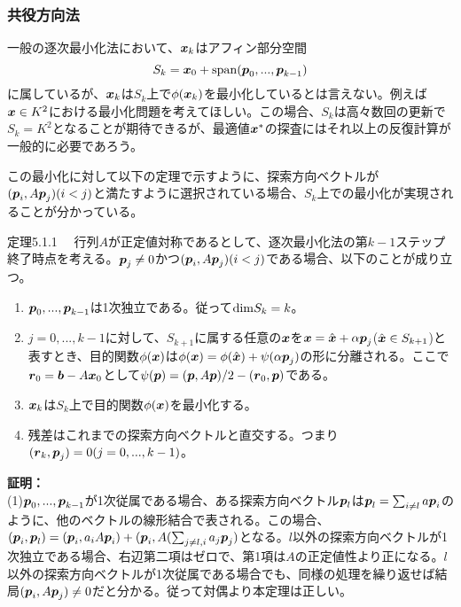 \documentclass[dvipdfmx, 9pt, a4paper]{jsarticle}
\numberwithin{equation}{subsection}
\newcommand{\bm}[1]{{\mbox{\boldmath $#1$}}}
\begin{document}
\subsubsection{共役方向法}
一般の逐次最小化法において、$\bm x_k$はアフィン部分空間
\begin{equation}
S_k=\bm x_0+{\rm span}(\bm p_0, ..., \bm p_{k-1}) \notag
\end{equation}
に属しているが、$\bm x_k$は$S_k$上で$\phi(\bm x_k)$を最小化しているとは言えない。例えば$\bm x \in K^2$における最小化問題を考えてほしい。この場合、$S_k$は高々数回の更新で$S_k=K^2$となることが期待できるが、最適値$\bm x^*$の探査にはそれ以上の反復計算が一般的に必要であろう。\par
この最小化に対して以下の定理で示すように、探索方向ベクトルが$(\bm p_i, A\bm p_j)(i < j)$と満たすように選択されている場合、$S_k$上での最小化が実現されることが分かっている。
\begin{itembox}[l]{定理5.1.1}
　行列$A$が正定値対称であるとして、逐次最小化法の第$k-1$ステップ終了時点を考える。$\bm p_j \neq 0$かつ$(\bm p_i, A\bm p_j)(i < j)$である場合、以下のことが成り立つ。
\begin{enumerate}
\item $\bm p_0, ..., \bm p_{k-1}$は1次独立である。従って${\rm dim}S_k=k$。
\item $j=0, ..., k-1$に対して、$S_{k+1}$に属する任意の$\bm x$を$\bm x=\hat{\bm x}+\alpha \bm p_j$($\hat{\bm x} \in S_{k+1}$)と表すとき、目的関数$\phi(\bm x)$は$\phi(\bm x)=\phi(\hat{\bm x})+\psi(\alpha \bm p_j)$の形に分離される。ここで$\bm r_0=\bm b-A\bm x_0$として$\psi(\bm p)=(\bm p, A\bm p)/2-(\bm r_0, \bm p)$である。
\item $\bm x_k$は$S_k$上で目的関数$\phi(\bm x)$を最小化する。
\item 残差はこれまでの探索方向ベクトルと直交する。つまり$(\bm r_k, \bm p_j)=0(j=0, ..., k-1)$。
\end{enumerate}
\end{itembox}
{\bf 証明：}\\
(1)$\bm p_0, ..., \bm p_{k-1}$が1次従属である場合、ある探索方向ベクトル$\bm p_l$は$\bm p_l=\sum_{i\neq l} a\bm p_i$のように、他のベクトルの線形結合で表される。この場合、$(\bm p_i, \bm p_l)=(\bm p_i, a_iA\bm p_i)+(\bm p_i, A(\sum_{j \neq l, i}a_j\bm p_j)$となる。$l$以外の探索方向ベクトルが1次独立である場合、右辺第二項はゼロで、第1項は$A$の正定値性より正になる。$l$以外の探索方向ベクトルが1次従属である場合でも、同様の処理を繰り返せば結局$(\bm p_i, A\bm p_j) \neq 0$だと分かる。従って対偶より本定理は正しい。\\
\end{document}
